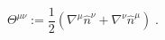 \begin{equation}
\Theta ^{\mu \nu }:=\frac{1}{2}\left( \nabla ^{\mu }\hat{n}^{\nu }+\nabla
^{\nu }\hat{n}^{\mu }\right) \;.  \label{Theta}
\end{equation}

